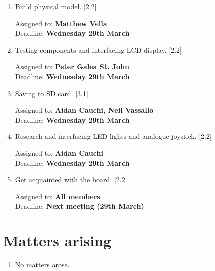 \documentclass[11pt,a4paper]{article}
\begin{document}
\begin{enumerate}

\item Build physical model. [2.2]
\begin{flushright}
Assigned to: \textbf{Matthew Vella} \\
Deadline: \textbf{Wednesday 29th March}
\end{flushright}

\item Testing components and interfacing LCD display. [2.2]
\begin{flushright}
Assigned to: \textbf{Peter Galea St. John} \\
Deadline: \textbf{Wednesday 29th March}
\end{flushright}

\item Saving to SD card. [3.1]
\begin{flushright}
Assigned to: \textbf{Aidan Cauchi, Neil Vassallo} \\
Deadline: \textbf{Wednesday 29th March}
\end{flushright}

\item Research and interfacing LED lights and analogue joystick. [2.2]
\begin{flushright}
Assigned to: \textbf{Aidan Cauchi} \\
Deadline: \textbf{Wednesday 29th March}
\end{flushright}

\item Get acquainted with the board. [2.2]
\begin{flushright}
Assigned to: \textbf{All members} \\
Deadline: \textbf{Next meeting (29th March)}
\end{flushright}

\end{enumerate}

\section*{Matters arising}

\begin{enumerate}
	
\item No matters arose. 
	
\end{enumerate}
\end{document}
